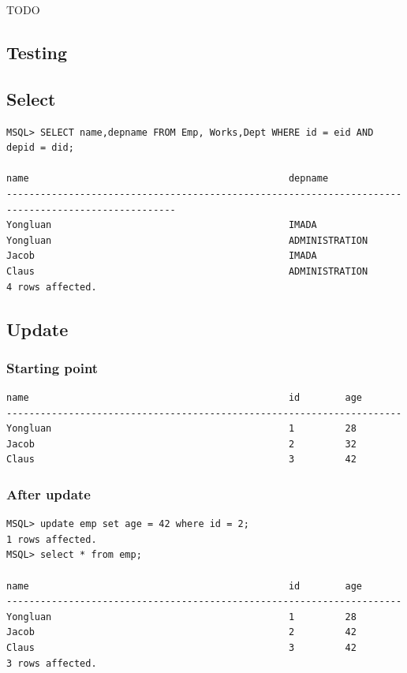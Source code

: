 \documentclass[a4paper,10pt,titlepage]{report}
\begin{document}
TODO


\subsection{Testing}

\subsection{Select}
\begin{lstlisting}
MSQL> SELECT name,depname FROM Emp, Works,Dept WHERE id = eid AND depid = did;

name                                              depname                                           
----------------------------------------------------------------------------------------------------
Yongluan                                          IMADA                                             
Yongluan                                          ADMINISTRATION                                    
Jacob                                             IMADA                                             
Claus                                             ADMINISTRATION                                    
4 rows affected.
\end{lstlisting}

\subsection{Update}
\subsubsection{Starting point}
\begin{lstlisting}
name                                              id        age       
----------------------------------------------------------------------
Yongluan                                          1         28        
Jacob                                             2         32        
Claus                                             3         42       
\end{lstlisting}
\subsubsection{After update}
\begin{lstlisting}
MSQL> update emp set age = 42 where id = 2;
1 rows affected.
MSQL> select * from emp;

name                                              id        age       
----------------------------------------------------------------------
Yongluan                                          1         28        
Jacob                                             2         42        
Claus                                             3         42        
3 rows affected.
\end{lstlisting}
\end{document}
